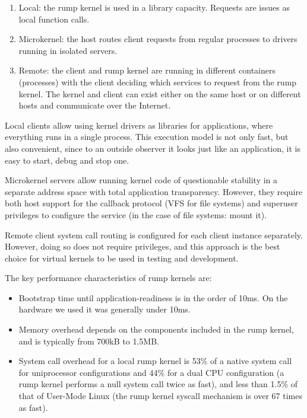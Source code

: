 \begin{enumerate}
\item	Local: the rump kernel is used in a library capacity.
	Requests are issues as local function calls.

\item   Microkernel: the host routes client requests from regular
	processes to drivers running in isolated servers.

\item   Remote: the client and rump kernel are running in
	different containers (processes) with the client deciding
	which services to request from the rump kernel.  The kernel
	and client can exist either on the same host or on
	different hosts and communicate over the Internet.
\end{enumerate}

Local clients allow using kernel drivers as libraries for applications,
where everything runs in a single process.  This execution model is not
only fast, but also convenient, since to an outside observer it looks
just like an application, \ie it is easy to start, debug and stop one.

Microkernel servers allow running kernel code of questionable stability in
a separate address space with total application transparency.  However,
they require both host support for the callback protocol (\eg VFS for
file systems) and superuser privileges to configure the service (in the
case of file systems: mount it).

Remote client system call routing is configured for each client
instance separately.  However, doing so does not require privileges,
and this approach is the best choice for virtual kernels to be used in
testing and development.

The key performance characteristics of rump kernels are:

\begin{itemize}
\item	Bootstrap time until application-readiness is in the order of
	10ms.  On the hardware we used it was generally under 10ms.

\item	Memory overhead depends on the components
	included in the rump kernel, and is typically from 700kB to 1.5MB.

\item   System call overhead for a local rump kernel is 53\% of a
	native system call for uniprocessor configurations and 44\%
	for a dual CPU configuration (\ie a rump kernel performs
	a null system call twice as fast), and less than 1.5\% of
	that of User-Mode Linux (the rump kernel syscall mechanism
	is over 67 times as fast).
\end{itemize}

